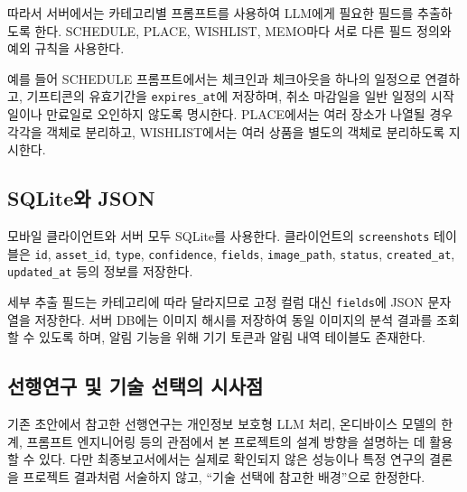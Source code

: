 \documentclass[11pt,a4paper]{article}
\begin{document}
따라서 서버에서는 카테고리별 프롬프트를 사용하여 LLM에게 필요한 필드를 추출하도록 한다. SCHEDULE, PLACE, WISHLIST, MEMO마다 서로 다른 필드 정의와 예외 규칙을 사용한다.

예를 들어 SCHEDULE 프롬프트에서는 체크인과 체크아웃을 하나의 일정으로 연결하고, 기프티콘의 유효기간을 \texttt{expires\_at}에 저장하며, 취소 마감일을 일반 일정의 시작일이나 만료일로 오인하지 않도록 명시한다. PLACE에서는 여러 장소가 나열될 경우 각각을 객체로 분리하고, WISHLIST에서는 여러 상품을 별도의 객체로 분리하도록 지시한다.

\subsection{SQLite와 JSON}

모바일 클라이언트와 서버 모두 SQLite를 사용한다. 클라이언트의 \texttt{screenshots} 테이블은 \texttt{id}, \texttt{asset\_id}, \texttt{type}, \texttt{confidence}, \texttt{fields}, \texttt{image\_path}, \texttt{status}, \texttt{created\_at}, \texttt{updated\_at} 등의 정보를 저장한다.

세부 추출 필드는 카테고리에 따라 달라지므로 고정 컬럼 대신 \texttt{fields}에 JSON 문자열을 저장한다. 서버 DB에는 이미지 해시를 저장하여 동일 이미지의 분석 결과를 조회할 수 있도록 하며, 알림 기능을 위해 기기 토큰과 알림 내역 테이블도 존재한다.

\subsection{선행연구 및 기술 선택의 시사점}

기존 초안에서 참고한 선행연구는 개인정보 보호형 LLM 처리, 온디바이스 모델의 한계, 프롬프트 엔지니어링 등의 관점에서 본 프로젝트의 설계 방향을 설명하는 데 활용할 수 있다. 다만 최종보고서에서는 실제로 확인되지 않은 성능이나 특정 연구의 결론을 프로젝트 결과처럼 서술하지 않고, ``기술 선택에 참고한 배경''으로 한정한다.
\end{document}
